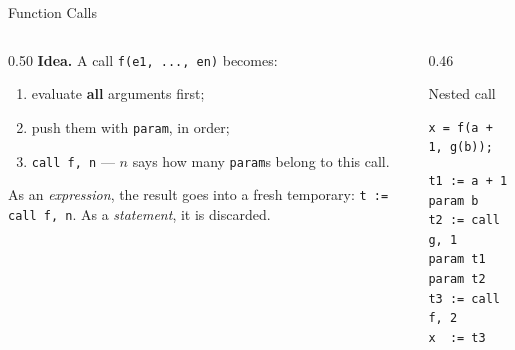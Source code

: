 \documentclass[aspectratio=169]{beamer}
\newcommand{\tc}[1]{\texttt{#1}}
\begin{document}
\begin{frame}[fragile]{Function Calls}
  \begin{columns}[T]
    \begin{column}{0.50\textwidth}
      \textbf{Idea.} A call \tc{f(e1, ..., en)} becomes:
      \begin{enumerate}
        \item evaluate \textbf{all} arguments first;
        \item push them with \tc{param}, in order;
        \item \tc{call f, n} — $n$ says how many \tc{param}s belong to this call.
      \end{enumerate}
      As an \emph{expression}, the result goes into a fresh temporary:
      \tc{t := call f, n}. As a \emph{statement}, it is discarded.
    \end{column}
    \begin{column}{0.46\textwidth}
      \begin{block}{Nested call}
        \begin{verbatim}
x = f(a + 1, g(b));
        \end{verbatim}
        \vspace{0.2em}
        \begin{verbatim}
t1 := a + 1
param b
t2 := call g, 1
param t1
param t2
t3 := call f, 2
x  := t3
        \end{verbatim}
      \end{block}
    \end{column}
  \end{columns}
\end{frame}
\end{document}
